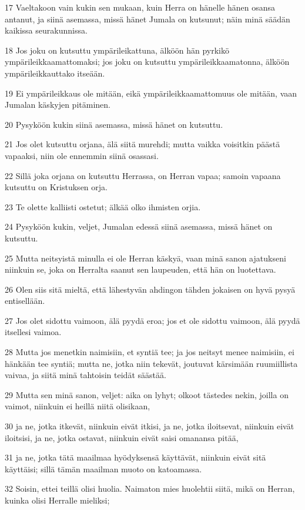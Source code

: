 \par 17 Vaeltakoon vain kukin sen mukaan, kuin Herra on hänelle hänen osansa antanut, ja siinä asemassa, missä hänet Jumala on kutsunut; näin minä säädän kaikissa seurakunnissa.
\par 18 Jos joku on kutsuttu ympärileikattuna, älköön hän pyrkikö ympärileikkaamattomaksi; jos joku on kutsuttu ympärileikkaamatonna, älköön ympärileikkauttako itseään.
\par 19 Ei ympärileikkaus ole mitään, eikä ympärileikkaamattomuus ole mitään, vaan Jumalan käskyjen pitäminen.
\par 20 Pysyköön kukin siinä asemassa, missä hänet on kutsuttu.
\par 21 Jos olet kutsuttu orjana, älä siitä murehdi; mutta vaikka voisitkin päästä vapaaksi, niin ole ennemmin siinä osassasi.
\par 22 Sillä joka orjana on kutsuttu Herrassa, on Herran vapaa; samoin vapaana kutsuttu on Kristuksen orja.
\par 23 Te olette kalliisti ostetut; älkää olko ihmisten orjia.
\par 24 Pysyköön kukin, veljet, Jumalan edessä siinä asemassa, missä hänet on kutsuttu.
\par 25 Mutta neitsyistä minulla ei ole Herran käskyä, vaan minä sanon ajatukseni niinkuin se, joka on Herralta saanut sen laupeuden, että hän on luotettava.
\par 26 Olen siis sitä mieltä, että lähestyvän ahdingon tähden jokaisen on hyvä pysyä entisellään.
\par 27 Jos olet sidottu vaimoon, älä pyydä eroa; jos et ole sidottu vaimoon, älä pyydä itsellesi vaimoa.
\par 28 Mutta jos menetkin naimisiin, et syntiä tee; ja jos neitsyt menee naimisiin, ei hänkään tee syntiä; mutta ne, jotka niin tekevät, joutuvat kärsimään ruumiillista vaivaa, ja siitä minä tahtoisin teidät säästää.
\par 29 Mutta sen minä sanon, veljet: aika on lyhyt; olkoot tästedes nekin, joilla on vaimot, niinkuin ei heillä niitä olisikaan,
\par 30 ja ne, jotka itkevät, niinkuin eivät itkisi, ja ne, jotka iloitsevat, niinkuin eivät iloitsisi, ja ne, jotka ostavat, niinkuin eivät saisi omanansa pitää,
\par 31 ja ne, jotka tätä maailmaa hyödyksensä käyttävät, niinkuin eivät sitä käyttäisi; sillä tämän maailman muoto on katoamassa.
\par 32 Soisin, ettei teillä olisi huolia. Naimaton mies huolehtii siitä, mikä on Herran, kuinka olisi Herralle mieliksi;
